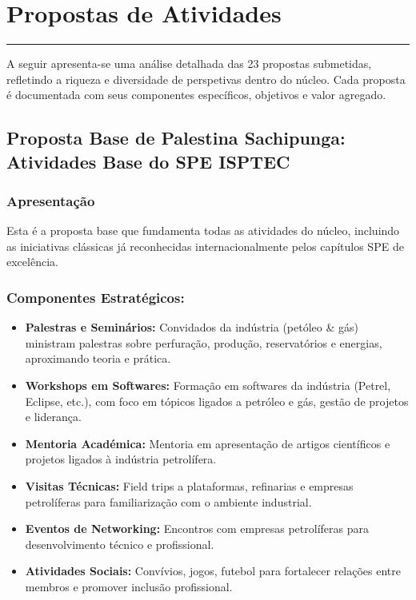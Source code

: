 \documentclass[12pt,a4paper]{article}
\begin{document}
\section{Propostas de Atividades}
\textcolor{spe-secondary}{\rule{\linewidth}{0.5pt}}

A seguir apresenta-se uma análise detalhada das 23 propostas submetidas, refletindo a riqueza e diversidade de perspetivas dentro do núcleo. Cada proposta é documentada com seus componentes específicos, objetivos e valor agregado.

\subsection{Proposta Base de Palestina Sachipunga: Atividades Base do SPE ISPTEC}

\subsubsection*{Apresentação}
Esta é a proposta base que fundamenta todas as atividades do núcleo, incluindo as iniciativas clássicas já reconhecidas internacionalmente pelos capítulos SPE de excelência.

\subsubsection*{Componentes Estratégicos:}

\begin{itemize}[itemsep=0.2cm]
    \item \textbf{Palestras e Seminários:} Convidados da indústria (petóleo \& gás) ministram palestras sobre perfuração, produção, reservatórios e energias, aproximando teoria e prática.
    
    \item \textbf{Workshops em Softwares:} Formação em softwares da indústria (Petrel, Eclipse, etc.), com foco em tópicos ligados a petróleo e gás, gestão de projetos e liderança.
    
    \item \textbf{Mentoria Académica:} Mentoria em apresentação de artigos científicos e projetos ligados à indústria petrolífera.
    
    \item \textbf{Visitas Técnicas:} Field trips a plataformas, refinarias e empresas petrolíferas para familiarização com o ambiente industrial.
    
    \item \textbf{Eventos de Networking:} Encontros com empresas petrolíferas para desenvolvimento técnico e profissional.
    
    \item \textbf{Atividades Sociais:} Convívios, jogos, futebol para fortalecer relações entre membros e promover inclusão profissional.
\end{itemize}
\end{document}
